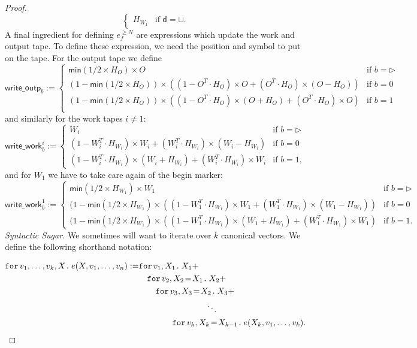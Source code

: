 \begin{proof}
$$\begin{cases}
        H_{W_1} & \text{if $\mathsf{d}=\sqcup$}. 	
    \end{cases}
    $$
    A final ingredient for defining $e_f^{\geq N}$ are expressions which update the work and output tape.
    To define these expression, we need the position and symbol to put on the tape. For the output tape we define
    $$
    \mathsf{write\_outp}_b:=\begin{cases}
    \mathsf{min}(1/2\times H_O)\times O & \text{if $b=\rhd$}\\
    (1-\mathsf{min}(1/2\times H_O))\times\left((1-O^T\cdot H_O)\times O + (O^T\cdot H_O)\times (O-H_O)\right) &\text{if $b=0$}\\
    (1-\mathsf{min}(1/2\times H_O))\times\left((1-O^T\cdot H_O)\times (O+H_O) + (O^T\cdot H_O)\times O\right) &\text{if $b=1$}\\
    \end{cases}
    $$
    and similarly for the work tapes $i\neq 1$:
    $$
    \mathsf{write\_work}_b^i:=\begin{cases}
    W_i & \text{if $b=\rhd$}\\
    (1-W_i^T\cdot H_{W_i})\times W_i + (W_i^T\cdot H_{W_i})\times (W_i-H_{W_i}) &\text{if $b=0$}\\
    (1-W_i^T\cdot H_{W_i})\times (W_i+H_{W_i}) + (W_i^T\cdot H_{W_i})\times W_i &\text{if $b=1$},
    \end{cases}
    $$
    and for  $W_1$ we have to take care again of the begin marker:
    $$
    \mathsf{write\_work}_b^1:=\begin{cases}
    \mathsf{min}(1/2\times H_{W_1})\times W_1 & \text{if $b=\rhd$}\\
    (1-\mathsf{min}(1/2\times H_{W_1})\times\left((1-W_1^T\cdot H_{W_1})\times W_1 + (W_1^T\cdot H_{W_1})\times (W_1-H_{W_1})\right) &\text{if $b=0$}\\
    (1-\mathsf{min}(1/2\times H_{W_1})\times\left((1-W_1^T\cdot H_{W_1})\times (W_1+H_{W_1}) + (W_1^T\cdot H_{W_1})\times W_1\right) &\text{if $b=1$}.
    \end{cases}
    $$
\textit{Syntactic Sugar.} We sometimes will want to iterate over $k$ canonical vectors. We define the following shorthand notation:

\begin{align*}
  \ffor{v_1,\ldots, v_k}{X}{e(X,v_1,\ldots, v_n)}:= &\ffor{v_1}{X_1}{X_1 +} \\
  &\hspace{1em}\initf{X_1}{v_2}{X_2}{X_2 + } \\
  &\hspace{2em}\initf{X_2}{v_3}{X_3}{X_3 + } \\
  &\hspace{8em}\ddots \\
  &\hspace{4em}\initf{X_{k-1}}{v_k}{X_k}{ e(X_k,v_1,\ldots, v_k)}.
\end{align*}


\end{proof}
